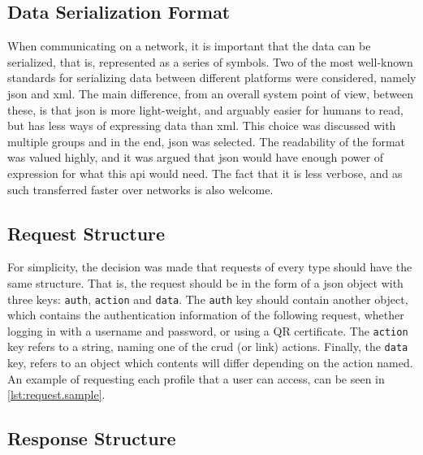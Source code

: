 \subsection{Data Serialization Format}

When communicating on a network, it is important that the data can be serialized, that is, represented as a series of symbols. Two of the most
well-known standards for serializing data between different platforms were considered, namely \ac{json} and \ac{xml}. The main difference, from
an overall system point of view, between these, is that \ac{json} is more light-weight, and arguably easier for humans to read, but has less 
ways of expressing data than \ac{xml}.\p
This choice was discussed with multiple groups and in the end, \ac{json} was selected. The readability of the format was valued highly, and it
was argued that \ac{json} would have enough power of expression for what this \ac{api} would need. The fact that it is less verbose, and as such
transferred faster over networks is also welcome.

\subsection{Request Structure}

For simplicity, the decision was made that requests of every type should have the same structure. That is, the request should be in the form of
a \ac{json} object with three keys: \texttt{auth}, \texttt{action} and \texttt{data}. The \texttt{auth} key should contain another object, which
contains the authentication information of the following request, whether logging in with a username and password, or using a QR certificate. The
\texttt{action} key refers to a string, naming one of the \ac{crud} (or link) actions. Finally, the \texttt{data} key, refers to an object which contents
will differ depending on the action named. An example of requesting each profile that a user can access, can be seen in \autoref{lst:request.sample}.



\subsection{Response Structure}

